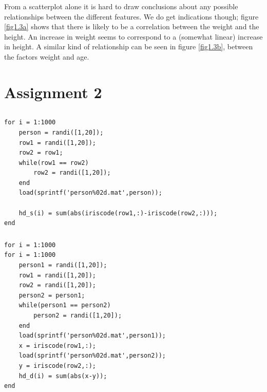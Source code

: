 \documentclass{article}
\begin{document}
From a scatterplot alone it is hard to draw conclusions about any possible relationships between the different features. 
We do get indications though; figure \ref{fig1.3a} shows that there is likely to be a correlation between the weight and the height.
An increase in weight seems to correspond to a (somewhat linear) increase in height. 
A similar kind of relationship can be seen in figure \ref{fig1.3b}, between the factors weight and age.

\section{Assignment 2}
\subsection{}

\subsection{}
\subsection{}
\subsection{}
\subsubsection{}
\begin{lstlisting}[title = Code for set S]
for i = 1:1000
    person = randi([1,20]);
    row1 = randi([1,20]);
    row2 = row1;
    while(row1 == row2)
        row2 = randi([1,20]);
    end
    load(sprintf('person%02d.mat',person));
    
    hd_s(i) = sum(abs(iriscode(row1,:)-iriscode(row2,:)));
end
\end{lstlisting}
\subsubsection{}
\begin{lstlisting}[title = Code for set D]
for i = 1:1000
for i = 1:1000
    person1 = randi([1,20]);
    row1 = randi([1,20]);
    row2 = randi([1,20]);
    person2 = person1;
    while(person1 == person2)
        person2 = randi([1,20]);
    end
    load(sprintf('person%02d.mat',person1));
    x = iriscode(row1,:);
    load(sprintf('person%02d.mat',person2));
    y = iriscode(row2,:);
    hd_d(i) = sum(abs(x-y));
end
\end{lstlisting}
\end{document}
